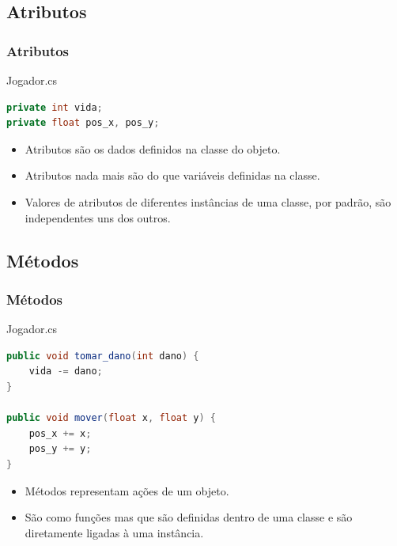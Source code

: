 \documentclass{beamer}
\begin{document}
	\subsection{Atributos} %
	\begin{frame}[fragile]
		\frametitle{Atributos}

		\begin{block}{Jogador.cs}
			\begin{lstlisting}[language=Java,basicstyle=\ttfamily,keywordstyle=\color{blue}]
private int vida;
private float pos_x, pos_y;
			\end{lstlisting}
		\end{block}

		\begin{itemize}
			\item Atributos são os dados definidos na classe do objeto.

			\item Atributos nada mais são do que variáveis definidas na classe.

			\item Valores de atributos de diferentes instâncias de uma classe,
				por padrão, são independentes uns dos outros.
		\end{itemize}
	\end{frame}

	\subsection{Métodos}
	\begin{frame}[fragile]
		\frametitle{Métodos}

		\begin{block}{Jogador.cs}
			\begin{lstlisting}[language=Java,basicstyle=\ttfamily,keywordstyle=\color{blue}]
public void tomar_dano(int dano) {
	vida -= dano;
}

public void mover(float x, float y) {
	pos_x += x;
	pos_y += y;
}
			\end{lstlisting}
		\end{block}

		\begin{itemize}
			\item Métodos representam ações de um objeto.

			\item São como funções mas que são definidas dentro de uma classe e
				são diretamente ligadas à uma instância.

		\end{itemize}
	\end{frame}
\end{document}
